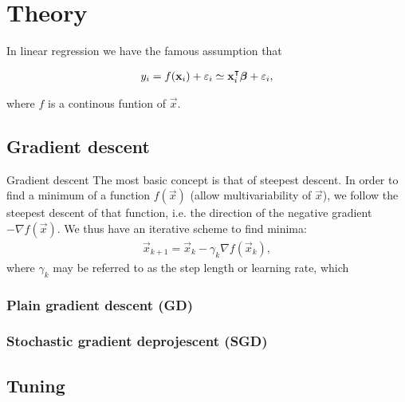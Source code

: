 \section{Theory}\label{sec:theory}

In linear regression we have the famous assumption that 

\begin{align}
    y_i = f(\mathbf{x}_i) + \varepsilon_i \simeq \mathbf{x}_i^\intercal \boldsymbol{\beta} + \varepsilon_i,
\end{align}

where $f$ is a continous funtion of $\vec{x}$.  


\subsection{Gradient descent}\label{sec:gradient_descent}
Gradient descent \citep{mhjensen} \fillertext
The most basic concept is that of steepest descent. In order to find a minimum of a function $f(\vec{x})$ (allow multivariability of $\vec{x}$), we follow the steepest descent of that function, i.e. the direction of the negative gradient $-\nabla f(\vec{x})$. We thus have an iterative scheme to find minima:
\begin{align}\label{eq:steepest_descent}
    \vec{x}_{k+1} = \vec{x}_k - \gamma_k\nabla f(\vec{x}_k),
\end{align}
where $\gamma_k$ may be referred to as the step length or learning rate, which

\subsubsection{Plain gradient descent (GD)}\label{sec:plain_gradient_descent}

\subsubsection{Stochastic gradient deprojescent (SGD)}\label{sec:stochastic_gradient_descent}


\subsection{Tuning}

